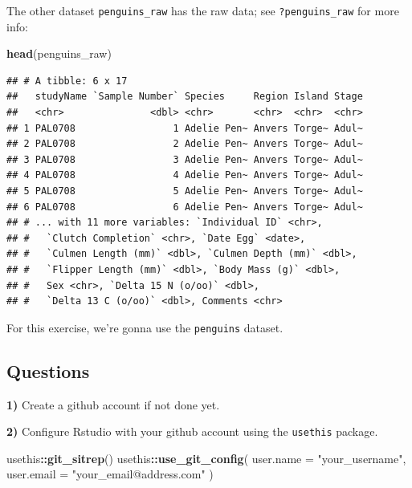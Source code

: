 \documentclass[
  12pt,
]{book}
\newenvironment{Shaded}{\begin{snugshade}}{\end{snugshade}}
\newcommand{\DataTypeTok}[1]{\textcolor[rgb]{0.13,0.29,0.53}{#1}}
\newcommand{\KeywordTok}[1]{\textcolor[rgb]{0.13,0.29,0.53}{\textbf{#1}}}
\newcommand{\NormalTok}[1]{#1}
\newcommand{\OperatorTok}[1]{\textcolor[rgb]{0.81,0.36,0.00}{\textbf{#1}}}
\newcommand{\StringTok}[1]{\textcolor[rgb]{0.31,0.60,0.02}{#1}}
\begin{document}
The other dataset \texttt{penguins\_raw} has the raw data; see \texttt{?penguins\_raw} for more info:

\begin{Shaded}
\begin{Highlighting}[]
\KeywordTok{head}\NormalTok{(penguins\_raw)}
\end{Highlighting}
\end{Shaded}

\begin{verbatim}
## # A tibble: 6 x 17
##   studyName `Sample Number` Species     Region Island Stage
##   <chr>               <dbl> <chr>       <chr>  <chr>  <chr>
## 1 PAL0708                 1 Adelie Pen~ Anvers Torge~ Adul~
## 2 PAL0708                 2 Adelie Pen~ Anvers Torge~ Adul~
## 3 PAL0708                 3 Adelie Pen~ Anvers Torge~ Adul~
## 4 PAL0708                 4 Adelie Pen~ Anvers Torge~ Adul~
## 5 PAL0708                 5 Adelie Pen~ Anvers Torge~ Adul~
## 6 PAL0708                 6 Adelie Pen~ Anvers Torge~ Adul~
## # ... with 11 more variables: `Individual ID` <chr>,
## #   `Clutch Completion` <chr>, `Date Egg` <date>,
## #   `Culmen Length (mm)` <dbl>, `Culmen Depth (mm)` <dbl>,
## #   `Flipper Length (mm)` <dbl>, `Body Mass (g)` <dbl>,
## #   Sex <chr>, `Delta 15 N (o/oo)` <dbl>,
## #   `Delta 13 C (o/oo)` <dbl>, Comments <chr>
\end{verbatim}

For this exercise, we're gonna use the \texttt{penguins} dataset.

\hypertarget{questions-1}{%
\subsection{Questions}\label{questions-1}}

\textbf{1)} Create a github account if not done yet.

\textbf{2)} Configure Rstudio with your github account using the \texttt{usethis} package.

\begin{Shaded}
\begin{Highlighting}[]
\NormalTok{usethis}\OperatorTok{::}\KeywordTok{git\_sitrep}\NormalTok{()}
\NormalTok{usethis}\OperatorTok{::}\KeywordTok{use\_git\_config}\NormalTok{(}
  \DataTypeTok{user.name =} \StringTok{"your\_username"}\NormalTok{,}
  \DataTypeTok{user.email =} \StringTok{"your\_email@address.com"}
\NormalTok{)}
\end{Highlighting}
\end{Shaded}
\end{document}
